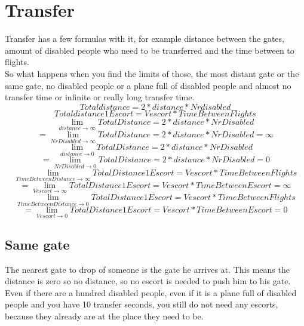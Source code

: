 \documentclass[a4paper, 11pt, notitlepage]{report}
\begin{document}
\section{Transfer}
Transfer has a few formulas with it, for example distance between the gates, amount of disabled people who need to be transferred and the time between to flights. \\
So what happens when you find the limits of those, the most distant gate or the same gate, no disabled people or a plane full of disabled people and almost no transfer time or infinite or really long transfer time.\\
\begin{equation}
Totaldistance = 2 * distance *Nrdisabled
\end{equation}
\begin{equation}
Totaldistance1Escort= Vescort * TimeBetweenFlights
\end{equation}
\begin{equation}
\lim_{distance \rightarrow \infty} TotalDistance = 2 * distance * NrDisabled
\end{equation}
\begin{equation}
 = \lim_{NrDisabled \rightarrow \infty} TotalDistance = 2 * distance * NrDisabled = \infty
\end{equation}
\begin{equation}
\lim_{distance \rightarrow 0} TotalDistance = 2 * distance * NrDisabled
\end{equation}
\begin{equation}
= \lim_{NrDisabled \rightarrow 0} TotalDistance = 2 * distance * NrDisabled = 0
\end{equation}
\begin{equation}
\lim_{TimeBetweenDistance \rightarrow \infty} TotalDistance1Escort = Vescort*TimeBetweenFlights
\end{equation}
\begin{equation}
= \lim_{Vescort \rightarrow \infty} TotalDistance1Escort = Vescort*TimeBetweenEscort = \infty
\end{equation}
\begin{equation}
\lim_{TimeBetweenDistance \rightarrow 0} TotalDistance1Escort = Vescort*TimeBetweenFlights
\end{equation}
\begin{equation}
= \lim_{Vescort \rightarrow 0} TotalDistance1Escort = Vescort*TimeBetweenEscort = 0
\end{equation}

\subsection{Same gate}
The nearest gate to drop of someone is the gate he arrives at. This means the distance is zero so no distance, so no escort is needed to push him to his gate. Even if there are a hundred disabled people, even if it is a plane full of disabled people and you have 10 transfer seconds, you still do not need any escorts, because they already are at the place they need to be.
\end{document}
